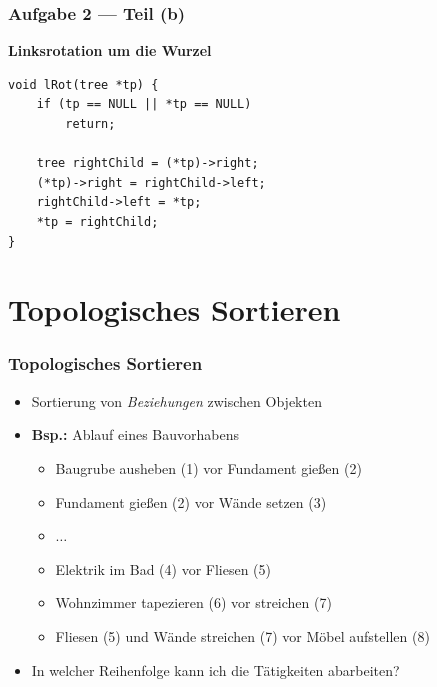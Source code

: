 \documentclass{beamer}
\begin{document}
\begin{frame}[fragile] \frametitle{Aufgabe 2 --- Teil (b)}
	\textbf{Linksrotation um die Wurzel}
	\begin{lstlisting}[style=notebook]
void lRot(tree *tp) {
	if (tp == NULL || *tp == NULL)
		return;
	
	tree rightChild = (*tp)->right;
	(*tp)->right = rightChild->left;
	rightChild->left = *tp;
	*tp = rightChild;
}
	\end{lstlisting}
	
\end{frame}

\section{Topologisches Sortieren}

\begin{frame} \frametitle{Topologisches Sortieren}
	\small
	\begin{itemize}
		\item Sortierung von \textit{Beziehungen} zwischen Objekten
		\item \textbf{Bsp.:} Ablauf eines Bauvorhabens \pause
		\begin{itemize}
			\item Baugrube ausheben (1) vor Fundament gießen (2)
			\item Fundament gießen (2) vor Wände setzen (3)
			\item $\dots$
			\item Elektrik im Bad (4) vor Fliesen (5)
			\item Wohnzimmer tapezieren (6) vor streichen (7)
			\item Fliesen (5) und Wände streichen (7) vor Möbel aufstellen (8)
		\end{itemize}
		\pause
		\begin{center}
		\end{center}
		\pause
		\item In welcher Reihenfolge kann ich die Tätigkeiten abarbeiten?
	\end{itemize}
\end{frame}
\end{document}
